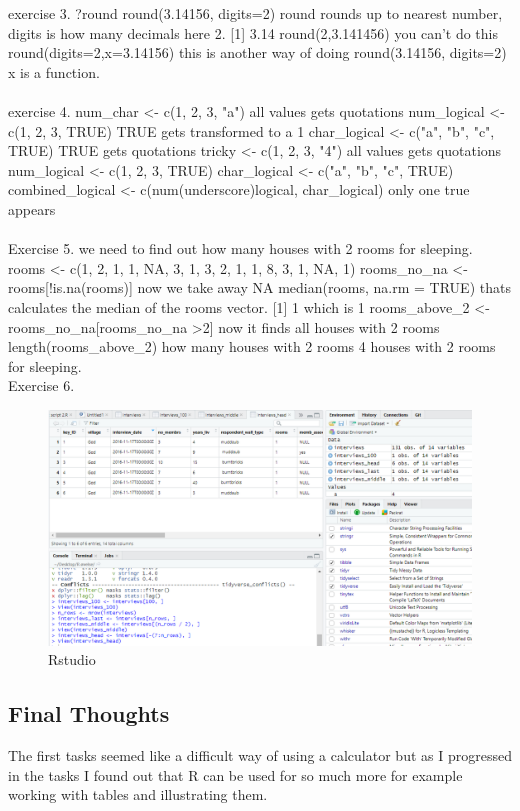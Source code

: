 \documentclass{article}
\begin{document}
exercise 3. ?round
round(3.14156, digits=2) round rounds up to nearest number, digits is how many decimals here 2. 
[1] 3.14
round(2,3.141456) you can't do this
round(digits=2,x=3.14156) this is another way of doing round(3.14156, digits=2) x is a function.\\\\

exercise 4. 
num\_char \textless- c(1, 2, 3, "a") all values gets quotations
 num\_logical \textless- c(1, 2, 3, TRUE) TRUE gets transformed to a 1
 char\_logical \textless- c("a", "b", "c", TRUE) TRUE gets quotations
 tricky \textless- c(1, 2, 3, "4") all values gets quotations
num\_logical \textless- c(1, 2, 3, TRUE)
char\_logical \textless- c("a", "b", "c", TRUE)
combined\_logical \textless- c(num(underscore)logical, char\_logical) only one true appears\\\\

Exercise 5. we need to find out how many houses with 2 rooms for sleeping. 
rooms \textless- c(1, 2, 1, 1, NA, 3, 1, 3, 2, 1, 1, 8, 3, 1, NA, 1)
rooms\_no\_na \textless- rooms[!is.na(rooms)] now we take away NA
median(rooms, na.rm = TRUE) thats calculates the median of the rooms vector.
[1] 1 which is 1
rooms\_above\_2 \textless- rooms\_no\_na[rooms\_no\_na \textgreater 2] now it finds all houses with 2 rooms 
length(rooms\_above\_2) how many houses with 2 rooms 
4 houses with 2 rooms for sleeping. \\


Exercise 6. 
\begin{figure}[H]
    \centering
    \includegraphics[width=\textwidth]{fotoR1.PNG}
    \caption{Rstudio}
    \label{fig:bil5}
\end{figure}

\subsection{Final Thoughts} The first tasks seemed like a difficult way of using a calculator but as I progressed in the tasks I found out that R can be used for so much more for example working with tables and illustrating them. 
\end{document}

